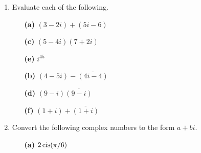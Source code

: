 {\begin{enumerate}
 
\bf\item\rm
Evaluate each of the following.
 
 
\vspace{3pt}        %
 
\hspace{-7pt}
\begin{minipage}[t]{4.6in}
\noindent
\begin{minipage}[t]{2.25in}
\begin{itemize}
 
 \item[{\bf (a)}]
$(3-2i)+ (5i-6)$
 
 \item[{\bf (c)}]
$(5-4i)(7+2i)$
 
 \item[{\bf (e)}]
$i^{45}$
 
\end{itemize}
\end{minipage} \hfill
\begin{minipage}[t]{2.25in}
\begin{itemize}
 
 \item[{\bf (b)}]
 $(4-5i)-\overline{(4i -4)}$
 
 \item[{\bf (d)}]
$(9-i) \overline{(9-i)}$
 
 \item[{\bf (f)}]
$(1+i)+\overline{(1+i)}$
 
\end{itemize}
\end{minipage}
\end{minipage}
 
\vspace{2pt}        %
 
 
\bf\item\rm   %
Convert the following complex numbers to the form $a + bi$.
 
 
\vspace{3pt}        %
 
\hspace{-7pt}
\begin{minipage}[t]{4.6in}
\noindent
\begin{minipage}[t]{2.25in}
\begin{itemize}
 
 \item[{\bf (a)}]
$2 \operatorname{cis}(\pi / 6 )$
 

\end{itemize}
\end{minipage}
\end{minipage}
\end{enumerate}}
